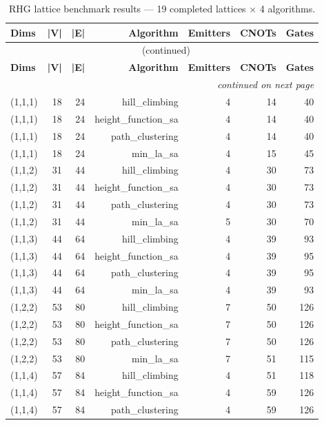 \begin{longtable}{lrrrrrr}
  \caption{RHG lattice benchmark results — 19 completed lattices × 4 algorithms.} \label{tab:rhg_results} \\
  \toprule
  \textbf{Dims} & \textbf{|V|} & \textbf{|E|} & \textbf{Algorithm} & \textbf{Emitters} & \textbf{CNOTs} & \textbf{Gates} \\
  \midrule
  \endfirsthead
  \multicolumn{7}{c}{\tablename\ \thetable{} (continued)} \\
  \toprule
  \textbf{Dims} & \textbf{|V|} & \textbf{|E|} & \textbf{Algorithm} & \textbf{Emitters} & \textbf{CNOTs} & \textbf{Gates} \\
  \midrule
  \endhead
  \midrule \multicolumn{7}{r}{\textit{continued on next page}} \\
  \endfoot
  \bottomrule
  \endlastfoot
  (1,1,1) & 18 & 24 & hill\_climbing & 4 & 14 & 40 \\
  (1,1,1) & 18 & 24 & height\_function\_sa & 4 & 14 & 40 \\
  (1,1,1) & 18 & 24 & path\_clustering & 4 & 14 & 40 \\
  (1,1,1) & 18 & 24 & min\_la\_sa & 4 & 15 & 45 \\
  (1,1,2) & 31 & 44 & hill\_climbing & 4 & 30 & 73 \\
  (1,1,2) & 31 & 44 & height\_function\_sa & 4 & 30 & 73 \\
  (1,1,2) & 31 & 44 & path\_clustering & 4 & 30 & 73 \\
  (1,1,2) & 31 & 44 & min\_la\_sa & 5 & 30 & 70 \\
  (1,1,3) & 44 & 64 & hill\_climbing & 4 & 39 & 93 \\
  (1,1,3) & 44 & 64 & height\_function\_sa & 4 & 39 & 95 \\
  (1,1,3) & 44 & 64 & path\_clustering & 4 & 39 & 95 \\
  (1,1,3) & 44 & 64 & min\_la\_sa & 4 & 39 & 93 \\
  (1,2,2) & 53 & 80 & hill\_climbing & 7 & 50 & 126 \\
  (1,2,2) & 53 & 80 & height\_function\_sa & 7 & 50 & 126 \\
  (1,2,2) & 53 & 80 & path\_clustering & 7 & 50 & 126 \\
  (1,2,2) & 53 & 80 & min\_la\_sa & 7 & 51 & 115 \\
  (1,1,4) & 57 & 84 & hill\_climbing & 4 & 51 & 118 \\
  (1,1,4) & 57 & 84 & height\_function\_sa & 4 & 59 & 126 \\
  (1,1,4) & 57 & 84 & path\_clustering & 4 & 59 & 126 \\

\end{longtable}
